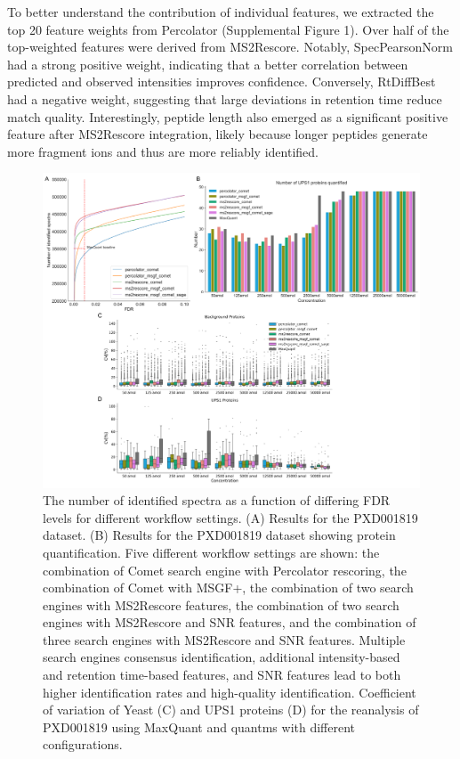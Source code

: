 \documentclass[12pt]{article}
\begin{document}
To better understand the contribution of individual features, we extracted the top 20 feature weights from Percolator (Supplemental Figure 1). Over half of the top-weighted features were derived from MS2Rescore. Notably, SpecPearsonNorm had a strong positive weight, indicating that a better correlation between predicted and observed intensities improves confidence. Conversely, RtDiffBest had a negative weight, suggesting that large deviations in retention time reduce match quality. Interestingly, peptide length also emerged as a significant positive feature after MS2Rescore integration, likely because longer peptides generate more fragment ions and thus are more reliably identified.

\begin{figure}[ht!]
	\centering
	\includegraphics[width=1\textwidth]{figures//PXD001819_V3.png}
	\caption{The number of identified spectra as a function of differing FDR levels for different workflow settings. (A) Results for the PXD001819 dataset. (B) Results for the PXD001819 dataset showing protein quantification. Five different workflow settings are shown: the combination of Comet search engine with Percolator rescoring, the combination of Comet with MSGF+, the combination of two search engines with MS2Rescore features, the combination of two search engines with MS2Rescore and SNR features, and the combination of three search engines with MS2Rescore and SNR features. Multiple search engines consensus identification, additional intensity-based and retention time-based features, and SNR features lead to both higher identification rates and high-quality identification. Coefficient of variation of Yeast (C) and UPS1 proteins (D) for the reanalysis of PXD001819 using MaxQuant and quantms with different configurations.}
	\label{fig:PXD001819_ms2rescore_pic}
\end{figure}
\end{document}
